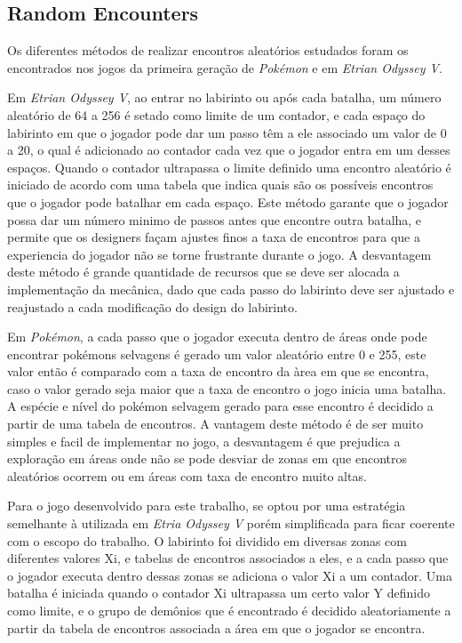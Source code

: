 \documentclass[
	12pt,				%
	openright,			%
	twoside,			%
	a4paper,			%
	english,			%
	french,				%
	spanish,			%
	brazil				%
	]{abntex2}
\begin{document}
\subsection{Random Encounters}

Os diferentes métodos de realizar encontros aleatórios estudados foram os encontrados nos jogos da primeira geração de \emph{Pokémon} e em \emph{Etrian Odyssey V}.

Em \emph{Etrian Odyssey V}, ao entrar no labirinto ou após cada batalha, um número aleatório de 64 a 256 é setado como limite de um contador, e cada espaço do labirinto em que o jogador pode dar um passo têm a ele associado um valor de 0 a 20, o qual é adicionado ao contador cada vez que o jogador entra em um desses espaços. Quando o contador ultrapassa o limite definido uma encontro aleatório é iniciado de acordo com uma tabela que indica quais são os possíveis encontros que o jogador pode batalhar em cada espaço. Este método garante que o jogador possa dar um número minimo de passos antes que encontre outra batalha, e permite que os designers façam ajustes finos a taxa de encontros para que a experiencia do jogador não se torne frustrante durante o jogo. A desvantagem deste método é grande quantidade de recursos que se deve ser alocada a implementação da mecânica, dado que cada passo do labirinto deve ser ajustado e reajustado a cada modificação do design do labirinto.

Em \emph{Pokémon}, a cada passo que o jogador executa dentro de áreas onde pode encontrar pokémons selvagens é gerado um valor aleatório entre 0 e 255, este valor então é comparado com a taxa de encontro da àrea em que se encontra, caso o valor gerado seja maior que a taxa de encontro o jogo inicia uma batalha. A espécie e nível do pokémon selvagem gerado para esse encontro é decidido a partir de uma tabela de encontros. A vantagem deste método é de ser muito simples e facil de implementar no jogo, a desvantagem é que prejudica a exploração em áreas onde não se pode desviar de zonas em que encontros aleatórios ocorrem ou em áreas com taxa de encontro muito altas.

Para o jogo desenvolvido para este trabalho, se optou por uma estratégia semelhante à utilizada em \emph{Etria Odyssey V} porém simplificada para ficar coerente com o escopo do trabalho. O labirinto foi dividido em diversas zonas com diferentes valores Xi, e tabelas de encontros associados a eles, e a cada passo que o jogador executa dentro dessas zonas se adiciona o valor Xi a um contador. Uma batalha é iniciada quando o contador Xi ultrapassa um certo valor Y definido como limite, e o grupo de demônios que é encontrado é decidido aleatoriamente a partir da tabela de encontros associada a área em que o jogador se encontra.
\pagebreak

\end{document}
